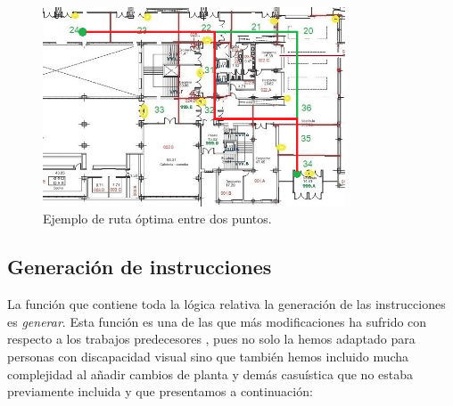 \begin{figure}[t]
	\centering
	\includegraphics[width=0.8\textwidth]{Imagenes/Capitulo4/mapa_ruta_optima}
	\caption{Ejemplo de ruta óptima entre dos puntos.}
	\label{fig:ruta_optima}
\end{figure}


\subsection{Generación de instrucciones}
\label{sub:genInstruc}

La función que contiene toda la lógica relativa la generación de las instrucciones es \textit{generar}. Esta función es una de las que más modificaciones ha sufrido con respecto a los trabajos predecesores \citep{TFGguia}, pues no solo la hemos adaptado para personas con discapacidad visual sino que también hemos incluido mucha complejidad al añadir cambios de planta y demás casuística que no estaba previamente incluida y que presentamos a continuación:

